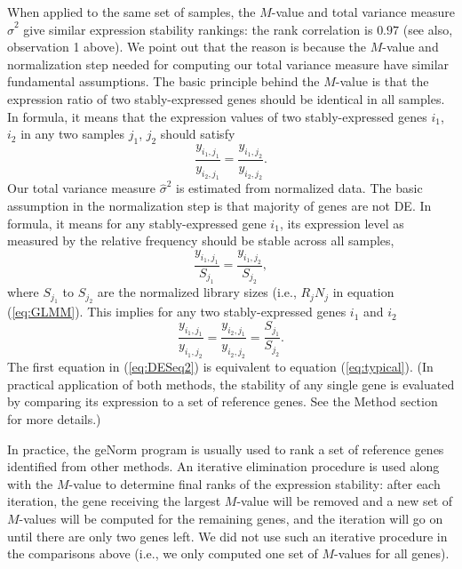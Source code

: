 \documentclass[11pt, a4paper]{article}
\begin{document}
When applied to the same set of samples, the $M$-value and total variance
measure $\hat\sigma^2$ give similar expression stability rankings: the rank
correlation is $0.97$ (see also, observation 1 above).
We point out that the reason is because the $M$-value and normalization step
needed for computing our total variance measure have similar fundamental
assumptions. 
The basic principle
behind the $M$-value is that the expression ratio of two stably-expressed
genes should be identical in all samples. In formula, it means that the
expression values of two stably-expressed genes $i_1$, $i_2$ in any two samples $j_1$, $j_2$
should satisfy
\begin{equation}\label{eq:typical}
   \dfrac{y_{i_1, j_1}}{y_{i_2, j_1}} = \dfrac{y_{i_1, j_2}}{y_{i_2, j_2}}.
\end{equation} 
Our total variance measure $\hat\sigma^2$ is estimated from normalized data.
The basic assumption in the normalization step is that majority of genes are
not DE. In formula, it means for any stably-expressed gene $i_1$, its expression
level as measured by the relative frequency should be stable across all
samples,
\begin{equation}\label{eq:DESeq} 
    \frac{y_{i_1, j_1}}{S_{j_1}}= \dfrac{y_{i_1, j_2}}{S_{j_2}},
\end{equation}
where $S_{j_1}$ to $S_{j_2}$ are the normalized library sizes (i.e., $R_j N_j$ in equation (\ref{eq:GLMM}).
This implies for any two stably-expressed genes $i_1$ and $i_2$
\begin{equation}\label{eq:DESeq2} 
    \frac{y_{i_1, j_1}}{y_{i_1, j_2}} = \frac{y_{i_2, j_1}}{y_{i_2, j_2}} =
    \frac{S_{j_1}}{S_{j_2}}.
\end{equation}
The first equation in (\ref{eq:DESeq2}) is equivalent to equation
(\ref{eq:typical}). (In practical application of both methods, the stability
of any single gene is evaluated by comparing its expression to a set of
reference genes. See the Method section for more details.)

In practice, the geNorm program \citep{vandesompele2002accurate} is usually
used to rank a set of reference genes identified from other methods.  An
iterative elimination procedure is used along with the $M$-value to determine
final ranks of the expression stability:  after each iteration, the gene
receiving the largest $M$-value will be removed and a new set of $M$-values
will be computed for the remaining genes, and the iteration will go on until
there are only two genes left.  We did not use such an iterative procedure in
the comparisons above (i.e., we only computed one set of $M$-values for all
genes). 
\end{document}
